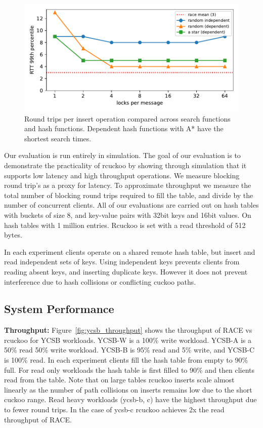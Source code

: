 \begin{figure}[ht]
    \includegraphics[width=0.99\linewidth]{fig/search_dependence.pdf}

    \caption{Round trips per insert operation compared
    across search functions and hash functions. Dependent
    hash functions with A* have the shortest search
    times.~}

    \label{fig:search_dependence}
\end{figure}

Our evaluation is run entirely in simulation. The goal of
our evaluation is to demonstrate the practicality of rcuckoo
by showing through simulation that it supports low latency
and high throughput operations. We measure blocking round
trip's as a proxy for latency. To approximate throughput we
measure the total number of blocking round trips required to
fill the table, and divide by the number of concurrent
clients. All of our evaluations are carried out on hash
tables with buckets of size 8, and key-value pairs with
32bit keys and 16bit values. On hash tables with 1 million
entries. Rcuckoo is set with a read threshold of 512 bytes.

In each experiment clients operate on a shared remote hash
table, but insert and read independent sets of keys. Using
independent keys prevents clients from reading absent keys,
and inserting duplicate keys.  However it does not prevent
interference due to hash collisions or conflicting cuckoo
paths.


\subsection{System Performance}

\textbf{Throughput:} Figure~\ref{fig:ycsb_throughput} shows
the throughput of RACE vs rcuckoo for YCSB workloads. YCSB-W
is a 100\% write workload. YCSB-A is a 50\% read 50\% write
workload. YCSB-B is 95\% read and 5\% write, and YCSB-C is
100\% read.  In each experiment clients fill the hash table
from empty to 90\% full. For read only workloads the hash
table is first filled to 90\% and then clients read from the
table.  Note that on large tables rcuckoo inserts scale
almost linearly as the number of path collisions on inserts
remains low due to the short cuckoo range.  Read heavy
workloads (ycsb-b, c) have the highest throughput due to
fewer round trips. In the case of ycsb-c rcuckoo achieves 2x
the read throughput of RACE.


